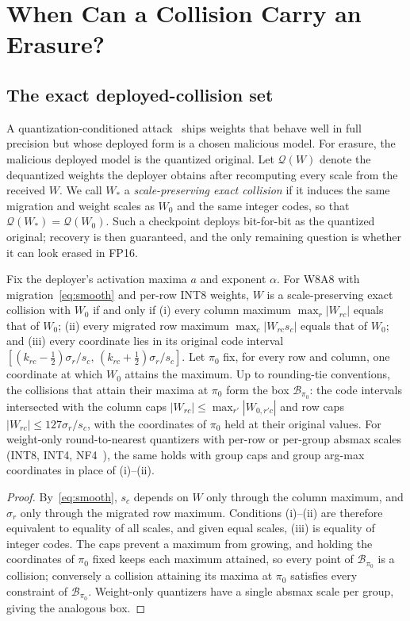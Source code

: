 \section{When Can a Collision Carry an Erasure?}
\label{sec:theory}
\subsection{The exact deployed-collision set}
A quantization-conditioned attack~\cite{egashira2024} ships weights that behave well
in full precision but whose deployed form is a chosen malicious model. For erasure,
the malicious deployed model is the quantized original. Let $\mathcal{Q}(W)$
denote the dequantized weights the deployer obtains after recomputing every scale
from the received $W$. We call $W_*$ a \emph{scale-preserving exact collision} if it
induces the same migration and weight scales as $W_0$ and the same integer codes, so
that $\mathcal{Q}(W_*)=\mathcal{Q}(W_0)$. Such a checkpoint deploys bit-for-bit as the
quantized original; recovery is then guaranteed, and the only remaining question is
whether it can look erased in FP16.

\begin{proposition}
\label{prop:box}
Fix the deployer's activation maxima $a$ and exponent $\alpha$. For
W8A8 with migration~\eqref{eq:smooth} and per-row INT8 weights, $W$ is a
scale-preserving exact collision with $W_0$ if and only if
(i) every column maximum $\max_r|W_{rc}|$ equals that of $W_0$;
(ii) every migrated row maximum $\max_c|W_{rc}s_c|$ equals that of $W_0$; and
(iii) every coordinate lies in its original code interval
$[(k_{rc}-\tfrac12)\sigma_r/s_c,\,(k_{rc}+\tfrac12)\sigma_r/s_c]$.
Let $\pi_0$ fix, for every row and column, one coordinate at which $W_0$ attains the
maximum. Up to rounding-tie conventions, the collisions that attain their maxima at
$\pi_0$ form the box $\mathcal{B}_{\pi_0}$: the code intervals intersected with the
column caps $|W_{rc}|\le\max_{r'}|W_{0,r'c}|$ and row caps $|W_{rc}|\le127\sigma_r/s_c$,
with the coordinates of $\pi_0$ held at their original values. For weight-only
round-to-nearest quantizers with per-row or per-group absmax scales (INT8, INT4,
NF4~\cite{qlora}), the same holds with group caps and group arg-max coordinates in
place of (i)--(ii).
\end{proposition}
\begin{proof}
By~\eqref{eq:smooth}, $s_c$ depends on $W$ only through the column maximum, and
$\sigma_r$ only through the migrated row maximum. Conditions (i)--(ii) are therefore
equivalent to equality of all scales, and given equal scales, (iii) is equality of
integer codes. The caps prevent a maximum from growing, and holding the coordinates of
$\pi_0$ fixed keeps each maximum attained, so every point of $\mathcal{B}_{\pi_0}$ is a
collision; conversely a collision attaining its maxima at $\pi_0$ satisfies every
constraint of $\mathcal{B}_{\pi_0}$. Weight-only quantizers have a single absmax scale
per group, giving the analogous box.
\end{proof}


